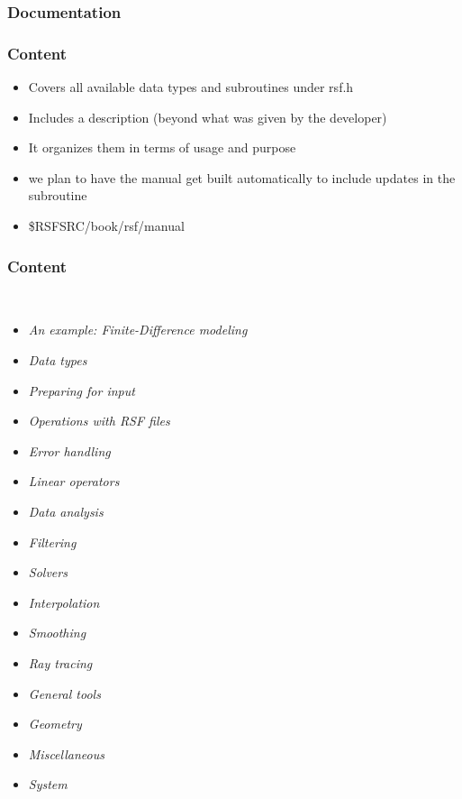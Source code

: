 
\begin{frame} \frametitle{Documentation}


\end{frame}
\cwpnote{}

\begin{frame} \frametitle{Content}

\begin{itemize}
   \item Covers all available data types and subroutines under rsf.h
   \item Includes a description (beyond what was given by the developer)
   \item It organizes them in terms of usage and purpose
   \item we plan to have the manual get built automatically to include
     updates in the subroutine
 \item \$RSFSRC/book/rsf/manual
\end{itemize}

\end{frame}
\cwpnote{}

\begin{frame} \frametitle{Content}\
\vspace{-0.2in}

\begin{itemize}
\item \emph{An example: Finite-Difference modeling}
\item \emph{Data types}\label{sec:datatypes}
\item \emph{Preparing for input}\label{sec:input}
\item \emph{Operations with RSF files}\label{sec:files}
\item \emph{Error handling}\label{sec:error}
\item \emph{Linear operators}\label{sec:lop}
\item \emph{Data analysis}\label{sec:analysis}
\item \emph{Filtering}\label{sec:filter}
\item \emph{Solvers}\label{sec:solvers}
\item \emph{Interpolation}\label{sec:interpolation}
\item \emph{Smoothing}\label{sec:smoothing}
\item \emph{Ray tracing}\label{sec:ray}
\item \emph{General tools}\label{sec:general}
\item \emph{Geometry}\label{sec:geometry}
\item \emph{Miscellaneous}\label{sec:misc}
\item \emph{System}\label{sec:system}
\end{itemize}
\end{frame}
\cwpnote{}


